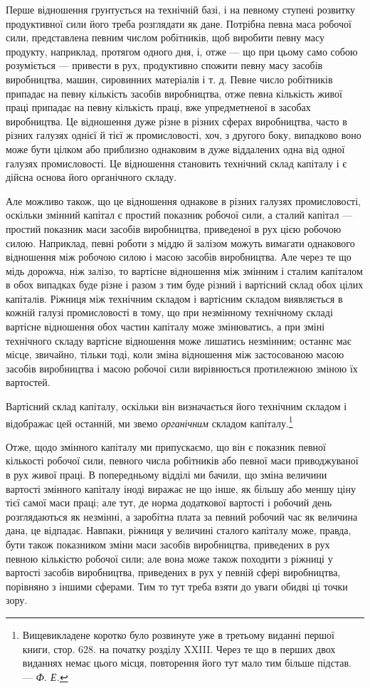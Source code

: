 Перше відношення грунтується на технічній базі, і на певному
ступені розвитку продуктивної сили його треба розглядати
як дане. Потрібна певна маса робочої сили, представлена
певним числом робітників, щоб виробити певну масу продукту,
наприклад, протягом одного дня, і, отже — що при цьому само
собою розуміється — привести в рух, продуктивно спожити
певну масу засобів виробництва, машин, сировинних матеріалів
і т. д. Певне число робітників припадає на певну кількість засобів
виробництва, отже певна кількість живої праці припадає
на певну кількість праці, вже упредметненої в засобах виробництва.
Це відношення дуже різне в різних сферах виробництва,
часто в різних галузях однієї й тієї ж промисловості, хоч, з другого
боку, випадково воно може бути цілком або приблизно
однаковим в дуже віддалених одна від одної галузях промисловості.
Це відношення становить технічний склад капіталу і є дійсна
основа його органічного складу.

Але можливо також, що це відношення однакове в різних
галузях промисловості, оскільки змінний капітал є простий показник
робочої сили, а сталий капітал — простий показник маси
засобів виробництва, приведеної в рух цією робочою силою.
Наприклад, певні роботи з міддю й залізом можуть вимагати
однакового відношення між робочою силою і масою засобів
виробництва. Але через те що мідь дорожча, ніж залізо, то вартісне
відношення між змінним і сталим капіталом в обох випадках
буде різне і разом з тим буде різний і вартісний склад
обох цілих капіталів. Ріжниця між технічним складом і вартісним
складом виявляється в кожній галузі промисловості
в тому, що при незмінному технічному складі вартісне відношення
обох частин капіталу може змінюватись, а при зміні
технічного складу вартісне відношення може лишатись незмінним;
останнє має місце, звичайно, тільки тоді, коли зміна
відношення між застосованою масою засобів виробництва і масою
робочої сили вирівнюється протилежною зміною їх вартостей.

Вартісний склад капіталу, оскільки він визначається його
технічним складом і відображає цей останній, ми звемо \emph{органічним}
складом капіталу.\footnote{
Вищевикладене коротко було розвинуте уже в третьому виданні першої
книги, стор. 628. на початку розділу XXIII. Через
те що в перших двох виданнях немає цього місця, повторення його тут мало
тим більше підстав. — \emph{Ф. Е.}
}

Отже, щодо змінного капіталу ми припускаємо, що він є показник
певної кількості робочої сили, певного числа робітників
або певної маси приводжуваної в рух живої праці. В попередньому
відділі ми бачили, що зміна величини вартості змінного
капіталу іноді виражає не що інше, як більшу або меншу ціну
тієї самої маси праці; але тут, де норма додаткової вартості
і робочий день розглядаються як незмінні, а заробітна плата
за певний робочий час як величина дана, це відпадає. Навпаки,
ріжниця у величині сталого капіталу може, правда, бути також
показником зміни маси засобів виробництва, приведених в рух
певною кількістю робочої сили; але вона може також походити
з ріжниці у вартості засобів виробництва, приведених в рух
у певній сфері виробництва, порівняно з іншими сферами. Тим
то тут треба взяти до уваги обидві ці точки зору.

